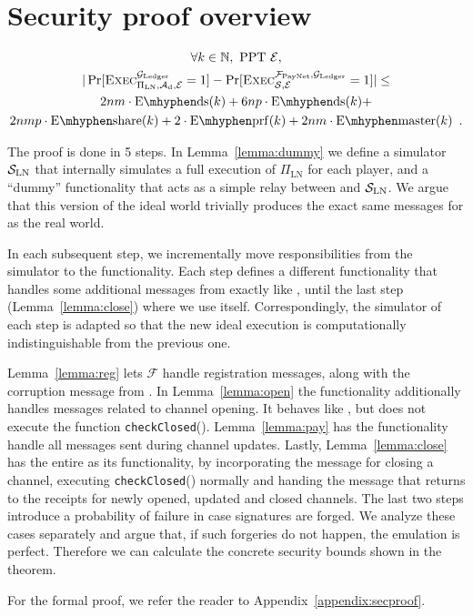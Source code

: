 \section{Security proof overview}
  \begin{theorem}
    \label{theorem:simulation}
    \begin{gather*}
      \forall k \in \mathbb{N}, \text{ PPT } \environment, \\
      |\Pr[\textsc{Exec}^{\ledger}_{\Pi_{\mathrm{LN}}, \adversary_{\mathrm{d}},
      \environment} = 1] - \Pr[\textsc{Exec}^{\fpaynet, \ledger}_{\simulator,
      \environment} = 1]| \leq \\
      2nm \cdot \mathrm{E \mhyphen ds}(k) + 6np \cdot \mathrm{E \mhyphen ds}(k) +
      \\
      2nmp \cdot \mathrm{E \mhyphen share}(k) + 2 \cdot \mathrm{E \mhyphen
      prf}(k) + 2nm \cdot \mathrm{E \mhyphen master}(k) \enspace.
    \end{gather*}
  \end{theorem}

  \begin{proofsketch}
    The proof is done in 5 steps. In Lemma~\ref{lemma:dummy} we define a
    simulator $\mathcal{S}_{\mathrm{LN}}$ that internally simulates a full
    execution of $\Pi_{\mathrm{LN}}$ for each player, and a ``dummy''
    functionality that acts as a simple relay between \environment{} and
    $\mathcal{S}_{\mathrm{LN}}$. We argue that this version of the ideal world
    trivially produces the exact same messages for \environment{} as the real
    world.

    In each subsequent step, we incrementally move responsibilities from the
    simulator to the functionality. Each step defines a different functionality
    that handles some additional messages from \environment{} exactly like
    \fpaynet, until the last step (Lemma~\ref{lemma:close}) where we use
    \fpaynet{} itself. Correspondingly, the simulator of each step is adapted so
    that the new ideal execution is computationally indistinguishable from the
    previous one.

    Lemma~\ref{lemma:reg} lets $\mathcal{F}$ handle registration messages, along
    with the corruption message from \simulator. In Lemma~\ref{lemma:open} the
    functionality additionally handles messages related to channel opening. It
    behaves like \fpaynet, but does not execute the function
    \texttt{checkClosed}(). Lemma~\ref{lemma:pay} has the functionality handle
    all messages sent during channel updates. Lastly, Lemma~\ref{lemma:close}
    has the entire \fpaynet{} as its functionality, by incorporating the message
    for closing a channel, executing \texttt{checkClosed}() normally and handing
    the message that returns to \environment{} the receipts for newly opened,
    updated and closed channels. The last two steps introduce a probability of
    failure in case signatures are forged. We analyze these cases separately and
    argue that, if such forgeries do not happen, the emulation is perfect.
    Therefore we can calculate the concrete security bounds shown in the
    theorem.
  \end{proofsketch}
  For the formal proof, we refer the reader to Appendix~\ref{appendix:secproof}.

